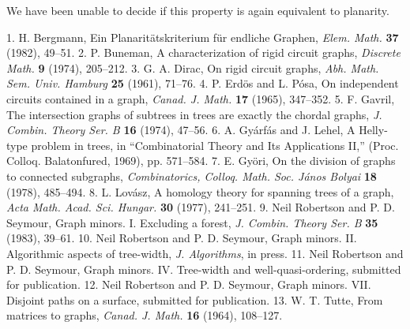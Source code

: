 We have been unable to decide if this property is again equivalent to planarity.


1. H. Bergmann, Ein Planarit\"atskriterium f\"ur endliche Graphen, \textit{Elem. Math.} \textbf{37} (1982), 49--51. 2. P. Buneman, A characterization of rigid circuit graphs, \textit{Discrete Math.} \textbf{9} (1974), 205--212. 3. G. A. Dirac, On rigid circuit graphs, \textit{Abh. Math. Sem. Univ. Hamburg} \textbf{25} (1961), 71--76. 4. P. Erd\"os and L. P\'osa, On independent circuits contained in a graph, \textit{Canad. J. Math.} \textbf{17} (1965), 347--352. 5. F. Gavril, The intersection graphs of subtrees in trees are exactly the chordal graphs, \textit{J. Combin. Theory Ser. B} \textbf{16} (1974), 47--56. 6. A. Gy\'arf\'as and J. Lehel, A Helly-type problem in trees, in ``Combinatorial Theory and Its Applications II,'' (Proc. Colloq. Balatonfured, 1969), pp. 571--584. 7. E. Gy\"ori, On the division of graphs to connected subgraphs, \textit{Combinatorics, Colloq. Math. Soc. J\'anos Bolyai} \textbf{18} (1978), 485--494. 8. L. Lov\'asz, A homology theory for spanning trees of a graph, \textit{Acta Math. Acad. Sci. Hungar.} \textbf{30} (1977), 241--251. 9. Neil Robertson and P. D. Seymour, Graph minors. I. Excluding a forest, \textit{J. Combin. Theory Ser. B} \textbf{35} (1983), 39--61. 10. Neil Robertson and P. D. Seymour, Graph minors. II. Algorithmic aspects of tree-width, \textit{J. Algorithms}, in press. 11. Neil Robertson and P. D. Seymour, Graph minors. IV. Tree-width and well-quasi-ordering, submitted for publication. 12. Neil Robertson and P. D. Seymour, Graph minors. VII. Disjoint paths on a surface, submitted for publication. 13. W. T. Tutte, From matrices to graphs, \textit{Canad. J. Math.} \textbf{16} (1964), 108--127.
